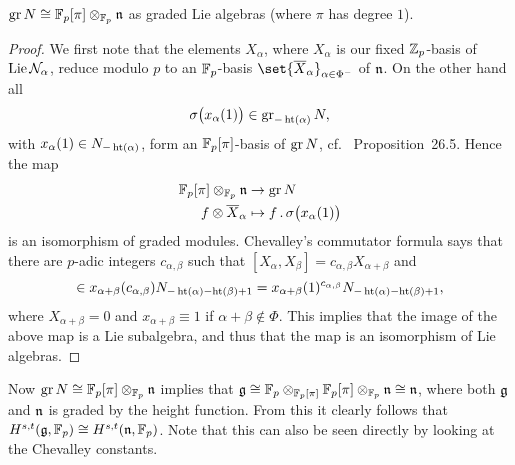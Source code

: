 \begin{lemma}
  $\operatorname{gr} N \cong \mathbb{F}_{p}[\pi] \otimes_{\mathbb{F}_{p}} \mathfrak{n}$ as graded Lie algebras (where $\pi$ has degree $1$).
\end{lemma}
\begin{proof}
  We first note that the elements $X_{\alpha}$, where $X_{\alpha}$ is our fixed $\mathbb{Z}_{p}$-basis of $\operatorname{Lie} \mathcal{N}_{\alpha}$, reduce modulo $p$ to an $\mathbb{F}_{p}$-basis $\set{\overline{X}_{\alpha}}_{\alpha \in \Phi^{-}}$ of $\mathfrak{n}$. On the other hand all
  \begin{equation*}
    \sigma\bigl(x_{\alpha}(1)\bigr) \in \operatorname{gr}_{-\operatorname{ht}(\alpha)} N,
  \end{equation*}
  with $x_{\alpha}(1) \in N_{-\operatorname{ht}(\alpha)}$, form an $\mathbb{F}_{p}[\pi]$-basis of $\operatorname{gr} N$, cf.\ \cite{Sch} Proposition~26.5. Hence the map
  \begin{align*}
    \mathbb{F}_{p}[\pi] \otimes_{\mathbb{F}_{p}} \mathfrak{n} &\to \operatorname{gr} N \\
    f \otimes \overline{X}_{\alpha} &\mapsto f \,.\, \sigma\bigl(x_{\alpha}(1)\bigr)
  \end{align*}
  is an isomorphism of graded modules.  Chevalley's commutator formula says that there are $p$-adic integers $c_{\alpha,\beta}$ such that $[X_{\alpha},X_{\beta}] = c_{\alpha,\beta}X_{\alpha+\beta}$ and
  \begin{equation*}
    [x_{\alpha}(1),x_{\beta}(1)] \in x_{\alpha+\beta}(c_{\alpha,\beta})N_{-\Ht(\alpha)-\Ht(\beta)+1} = x_{\alpha+\beta}(1)^{c_{\alpha,\beta}}N_{-\Ht(\alpha)-\Ht(\beta)+1},
  \end{equation*}
  where $X_{\alpha+\beta} = 0$ and $x_{\alpha+\beta} \equiv 1$ if $\alpha+\beta \notin \Phi$. This implies that the image of the above map is a Lie subalgebra, and thus that the map is an isomorphism of Lie algebras.
\end{proof}

Now $\operatorname{gr} N \cong \mathbb{F}_p[\pi] \otimes_{\mathbb{F}_p} \mathfrak{n}$ implies that $\mathfrak{g} \cong \mathbb{F}_p \otimes_{\mathbb{F}_p[\pi]} \mathbb{F}_p[\pi] \otimes_{\mathbb{F}_p} \mathfrak{n} \cong \mathfrak{n}$, where both $\mathfrak{g}$ and $\mathfrak{n}$ is graded by the height function. From this it clearly follows that $H^{s,t}(\mathfrak{g},\mathbb{F}_{p}) \cong H^{s,t}(\mathfrak{n},\mathbb{F}_{p})$. Note that this can also be seen directly by looking at the Chevalley constants.

